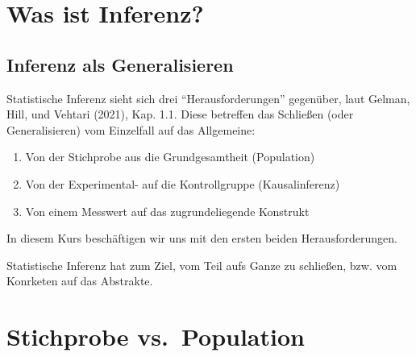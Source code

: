 \documentclass[
  a4paper,
  DIV=11]{scrreprt}
\providecommand{\tightlist}{%
  \setlength{\itemsep}{0pt}\setlength{\parskip}{0pt}}\usepackage{longtable,booktabs,array}
\theoremstyle{definition}
\theoremstyle{remark}
\begin{document}
\hypertarget{was-ist-inferenz}{%
\section{Was ist Inferenz?}\label{was-ist-inferenz}}

\hypertarget{inferenz-als-generalisieren}{%
\subsection{Inferenz als
Generalisieren}\label{inferenz-als-generalisieren}}

Statistische Inferenz sieht sich drei ``Herausforderungen'' gegenüber,
laut Gelman, Hill, und Vehtari (2021), Kap. 1.1. Diese betreffen das
Schließen (oder Generalisieren) vom Einzelfall auf das Allgemeine:

\begin{enumerate}
\def\labelenumi{\arabic{enumi}.}
\tightlist
\item
  Von der Stichprobe aus die Grundgesamtheit (Population)
\item
  Von der Experimental- auf die Kontrollgruppe (Kausalinferenz)
\item
  Von einem Messwert auf das zugrundeliegende Konstrukt
\end{enumerate}

In diesem Kurs beschäftigen wir uns mit den ersten beiden
Herausforderungen.

\begin{tcolorbox}[enhanced jigsaw, title=\textcolor{quarto-callout-important-color}{\faExclamation}\hspace{0.5em}{Wichtig}, bottomtitle=1mm, bottomrule=.15mm, titlerule=0mm, colbacktitle=quarto-callout-important-color!10!white, colframe=quarto-callout-important-color-frame, leftrule=.75mm, left=2mm, toprule=.15mm, colback=white, arc=.35mm, breakable, toptitle=1mm, opacityback=0, rightrule=.15mm, coltitle=black, opacitybacktitle=0.6]

Statistische Inferenz hat zum Ziel, vom Teil aufs Ganze zu schließen,
bzw. vom Konrketen auf das Abstrakte.

\end{tcolorbox}

\hypertarget{stichprobe-vs.-population}{%
\section{Stichprobe vs.~Population}\label{stichprobe-vs.-population}}
\end{document}
